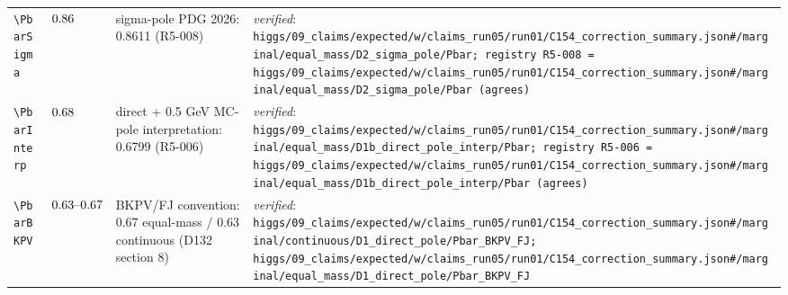 {\begin{longtable}{@{}>{\raggedright\arraybackslash}p{}>{\raggedright\arraybackslash}p{}>{\raggedright\arraybackslash}p{}>{\raggedright\arraybackslash}p{}@{}}
\texttt{\textbackslash PbarSigma} & $0.86$ & sigma-pole PDG 2026: 0.8611 (R5-008) & \emph{verified}: \texttt{higgs/\allowbreak{}09\_\allowbreak{}claims/\allowbreak{}expected/\allowbreak{}w/\allowbreak{}claims\_\allowbreak{}run05/\allowbreak{}run01/\allowbreak{}C154\_\allowbreak{}correction\_\allowbreak{}summary.json\#/\allowbreak{}marginal/\allowbreak{}equal\_\allowbreak{}mass/\allowbreak{}D2\_\allowbreak{}sigma\_\allowbreak{}pole/\allowbreak{}Pbar; registry R5-008 = higgs/\allowbreak{}09\_\allowbreak{}claims/\allowbreak{}expected/\allowbreak{}w/\allowbreak{}claims\_\allowbreak{}run05/\allowbreak{}run01/\allowbreak{}C154\_\allowbreak{}correction\_\allowbreak{}summary.json\#/\allowbreak{}marginal/\allowbreak{}equal\_\allowbreak{}mass/\allowbreak{}D2\_\allowbreak{}sigma\_\allowbreak{}pole/\allowbreak{}Pbar (agrees)} \\
\texttt{\textbackslash PbarInterp} & $0.68$ & direct + 0.5 GeV MC-pole interpretation: 0.6799 (R5-006) & \emph{verified}: \texttt{higgs/\allowbreak{}09\_\allowbreak{}claims/\allowbreak{}expected/\allowbreak{}w/\allowbreak{}claims\_\allowbreak{}run05/\allowbreak{}run01/\allowbreak{}C154\_\allowbreak{}correction\_\allowbreak{}summary.json\#/\allowbreak{}marginal/\allowbreak{}equal\_\allowbreak{}mass/\allowbreak{}D1b\_\allowbreak{}direct\_\allowbreak{}pole\_\allowbreak{}interp/\allowbreak{}Pbar; registry R5-006 = higgs/\allowbreak{}09\_\allowbreak{}claims/\allowbreak{}expected/\allowbreak{}w/\allowbreak{}claims\_\allowbreak{}run05/\allowbreak{}run01/\allowbreak{}C154\_\allowbreak{}correction\_\allowbreak{}summary.json\#/\allowbreak{}marginal/\allowbreak{}equal\_\allowbreak{}mass/\allowbreak{}D1b\_\allowbreak{}direct\_\allowbreak{}pole\_\allowbreak{}interp/\allowbreak{}Pbar (agrees)} \\
\texttt{\textbackslash PbarBKPV} & $0.63\text{--}0.67$ & BKPV/\allowbreak{}FJ convention: 0.67 equal-mass /\allowbreak{} 0.63 continuous (D132 section 8) & \emph{verified}: \texttt{higgs/\allowbreak{}09\_\allowbreak{}claims/\allowbreak{}expected/\allowbreak{}w/\allowbreak{}claims\_\allowbreak{}run05/\allowbreak{}run01/\allowbreak{}C154\_\allowbreak{}correction\_\allowbreak{}summary.json\#/\allowbreak{}marginal/\allowbreak{}continuous/\allowbreak{}D1\_\allowbreak{}direct\_\allowbreak{}pole/\allowbreak{}Pbar\_\allowbreak{}BKPV\_\allowbreak{}FJ; higgs/\allowbreak{}09\_\allowbreak{}claims/\allowbreak{}expected/\allowbreak{}w/\allowbreak{}claims\_\allowbreak{}run05/\allowbreak{}run01/\allowbreak{}C154\_\allowbreak{}correction\_\allowbreak{}summary.json\#/\allowbreak{}marginal/\allowbreak{}equal\_\allowbreak{}mass/\allowbreak{}D1\_\allowbreak{}direct\_\allowbreak{}pole/\allowbreak{}Pbar\_\allowbreak{}BKPV\_\allowbreak{}FJ} \\

\end{longtable}}
